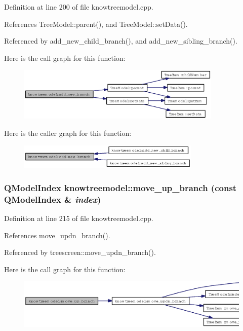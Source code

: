 Definition at line 200 of file knowtreemodel.cpp.

References Tree\-Model::parent(), and Tree\-Model::set\-Data().

Referenced by add\_\-new\_\-child\_\-branch(), and add\_\-new\_\-sibling\_\-branch().

Here is the call graph for this function:\begin{figure}[H]
\begin{center}
\leavevmode
\includegraphics[width=277pt]{classknowtreemodel_3870358ee6419e354a0e64d35602c496_cgraph}
\end{center}
\end{figure}


Here is the caller graph for this function:\begin{figure}[H]
\begin{center}
\leavevmode
\includegraphics[width=247pt]{classknowtreemodel_3870358ee6419e354a0e64d35602c496_icgraph}
\end{center}
\end{figure}
\subsubsection{\setlength{\rightskip}{0pt plus 5cm}QModel\-Index knowtreemodel::move\_\-up\_\-branch (const QModel\-Index \& {\em index})}\label{classknowtreemodel_dde544e3e416a51e6e132fa2f07426f8}




Definition at line 215 of file knowtreemodel.cpp.

References move\_\-updn\_\-branch().

Referenced by treescreen::move\_\-updn\_\-branch().

Here is the call graph for this function:\begin{figure}[H]
\begin{center}
\leavevmode
\includegraphics[width=396pt]{classknowtreemodel_dde544e3e416a51e6e132fa2f07426f8_cgraph}
\end{center}
\end{figure}


